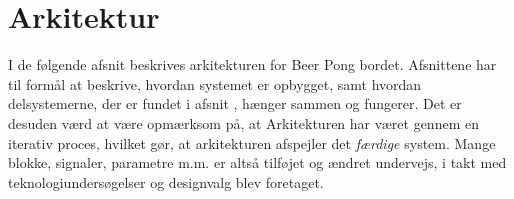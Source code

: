 \documentclass[Rapport/Rapport_main.tex]{subfiles}
\begin{document}
\section{Arkitektur}
I de følgende afsnit beskrives arkitekturen for Beer Pong bordet. Afsnittene har til formål at beskrive, hvordan systemet er opbygget, samt hvordan delsystemerne, der er fundet i  afsnit , hænger sammen og fungerer. Det er desuden værd at være opmærksom på, at Arkitekturen har været gennem en iterativ proces, hvilket gør, at arkitekturen afspejler det \textit{færdige} system. Mange blokke, signaler, parametre m.m. er altså tilføjet og ændret undervejs, i takt med teknologiundersøgelser og designvalg blev foretaget.


\newpage

\newpage

\newpage

\newpage

\end{document}
